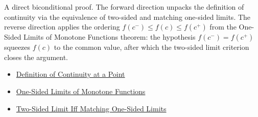 \begin{remark*}
A direct biconditional proof. The forward direction unpacks the definition of continuity via the equivalence of two-sided and matching one-sided limits. The reverse direction applies the ordering $f(c^{-}) \leq f(c) \leq f(c^{+})$ from the One-Sided Limits of Monotone Functions theorem: the hypothesis $f(c^{-}) = f(c^{+})$ squeezes $f(c)$ to the common value, after which the two-sided limit criterion closes the argument.
\end{remark*}

\begin{dependencies}
\begin{itemize}
  \item \hyperref[def:continuous-at-point]{Definition of Continuity at a Point}
  \item \hyperref[thm:monotone-one-sided-limits]{One-Sided Limits of Monotone Functions}
  \item \hyperref[thm:two-sided-limit-iff-matching-one-sided-limits]{Two-Sided Limit Iff Matching One-Sided Limits}
\end{itemize}
\end{dependencies}

\clearpage
